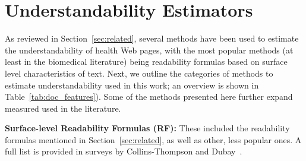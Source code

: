 
\section{ Understandability Estimators}
\label{sec:proxies}

As reviewed in Section~\ref{sec:related}, several methods have been used to estimate the understandability of health Web pages, with the most popular methods (at least in the biomedical literature) being readability formulas based on surface level characteristics of text. Next, we outline the categories of methods to estimate understandability used in this work; an overview is shown in Table~\ref{tab:doc_features}). Some of the methods presented here further expand measured used in the literature. 


 


\textbf{Surface-level Readability Formulas (RF):}
These included the readability formulas mentioned in Section~\ref{sec:related}, as well as other, less popular ones. A full list is provided in surveys by Collins-Thompson \cite{collins2014computational} and Dubay~\cite{dubay04}.



